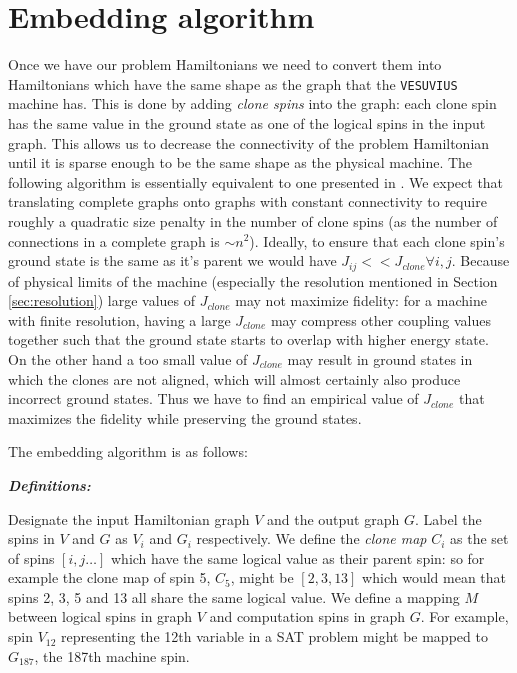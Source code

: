 \section{Embedding algorithm}
\label{sec:embed_algo}
Once we have our problem Hamiltonians we need to convert them into Hamiltonians which have the same shape as the graph that the \texttt{VESUVIUS} machine has.  This is done by adding \emph{clone spins} into the graph: each clone spin has the same value in the ground state as one of the logical spins in the input graph.  
This allows us to decrease the connectivity of the problem Hamiltonian until it is sparse enough to be the same shape as the physical machine.  The following algorithm is essentially equivalent to one presented in \cite{choi1}.
We expect that translating complete graphs onto graphs with constant connectivity to require roughly a quadratic size penalty in the number of clone spins (as the number of connections in a complete graph is $\sim n^2$).
Ideally, to ensure that each clone spin's ground state is the same as it's parent we would have $J_{ij} << J_{clone} \forall i,j$.  Because of physical limits of the machine (especially the resolution mentioned in Section \ref{sec:resolution}) large values of $J_{clone}$ may not maximize fidelity: for a machine with finite resolution, having a large $J_{clone}$ may compress other coupling values together such that the ground state starts to overlap with higher energy state.  On the other hand a too small value of $J_{clone}$ may result in ground states in which the clones are not aligned, which will almost certainly also produce incorrect ground states. Thus we have to find an empirical value of $J_{clone}$ that maximizes the fidelity while preserving the ground states.

The embedding algorithm is as follows:

\emph{\textbf{Definitions:}}

Designate the input Hamiltonian graph $V$ and the output graph $G$.  Label the spins in $V$ and $G$ as $V_i$ and $G_i$ respectively.
We define the \emph{clone map} $C_i$ as the set of spins $[i,j \ldots]$ which have the same logical value as their parent spin: so for example the clone map of spin 5, $C_5$, might be $[2,3,13]$ which would mean that spins 2, 3, 5 and 13 all share the same logical value.  
We define a mapping $M$ between logical spins in graph $V$ and computation spins in graph $G$.  For example, spin $V_{12}$ representing the 12th variable in a SAT problem might be mapped to $G_{187}$, the 187th machine spin.

